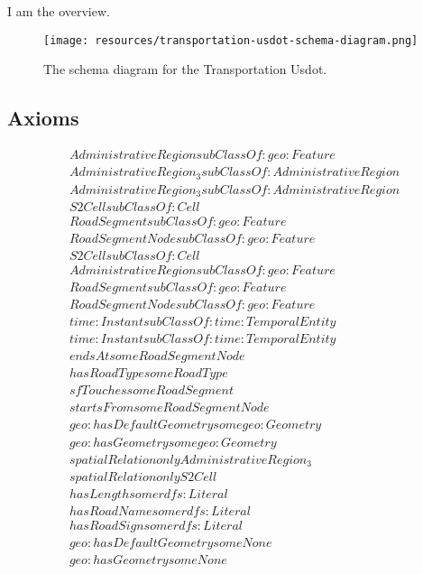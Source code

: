 I am the overview.

\begin{figure}[h!]
  \begin{center}
    \texttt{[image: resources/transportation-usdot-schema-diagram.png]}
  \end{center}
  \caption{The schema diagram for the Transportation Usdot.}
  \label{fig:ov-diagram}
\end{figure}


\subsection{Axioms}
\begin{align}
  AdministrativeRegion subClassOf: geo:Feature\\
  AdministrativeRegion_3 subClassOf: AdministrativeRegion\\
  AdministrativeRegion_3 subClassOf: AdministrativeRegion\\
  S2Cell subClassOf: Cell\\
  RoadSegment subClassOf: geo:Feature\\
  RoadSegmentNode subClassOf: geo:Feature\\
  S2Cell subClassOf: Cell\\
  AdministrativeRegion subClassOf: geo:Feature\\
  RoadSegment subClassOf: geo:Feature\\
  RoadSegmentNode subClassOf: geo:Feature\\
  time:Instant subClassOf: time:TemporalEntity\\
  time:Instant subClassOf: time:TemporalEntity\\
  endsAt some RoadSegmentNode \\
  hasRoadType some RoadType \\
  sfTouches some RoadSegment \\
  startsFrom some RoadSegmentNode \\
  geo:hasDefaultGeometry some geo:Geometry \\
  geo:hasGeometry some geo:Geometry \\
  spatialRelation only AdministrativeRegion_3 \\
  spatialRelation only S2Cell \\
  hasLength some rdfs:Literal \\
  hasRoadName some rdfs:Literal \\
  hasRoadSign some rdfs:Literal \\
  geo:hasDefaultGeometry some None \\
  geo:hasGeometry some None \end{align}



